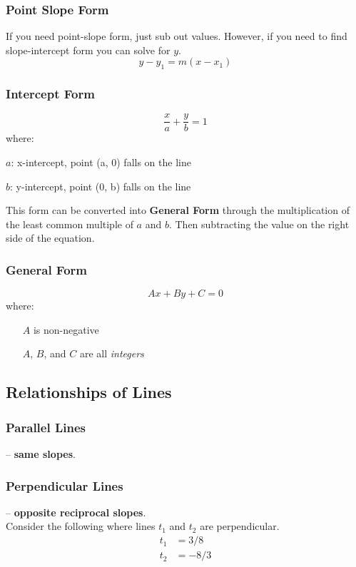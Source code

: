 \documentclass[twocolumn]{article}
\newenvironment{adescription}[1]
{\begin{list}{}%
	{\renewcommand\makelabel[1]{##1\hfill}%
		\settowidth\labelwidth{\makelabel{#1}}%
		\setlength\leftmargin{\labelwidth}
		\addtolength\leftmargin{\labelsep}}}
{\end{list}}
\newcommand{\bd}{\textbf}
\newcommand{\dquad}{\quad{}\quad{}}
\begin{document}
	    \subsubsection{Point Slope Form}
	    	If you need point-slope form, just sub out values. However, if you need to find slope-intercept form you can solve for $y$.
	    	\begin{equation*}
	    		y - y_1 = m(x - x_1)
	    	\end{equation*}
	    \subsubsection{Intercept Form}
	    	\begin{equation*}
	    		\frac{x}{a} + \frac{y}{b} = 1
	    	\end{equation*}
    		where:
    		\begin{adescription}{\dquad{}$b$:}
    			\item[\dquad{}$a$:] x-intercept, point (a, 0) falls on the line
    			\item[\dquad{}$b$:] y-intercept, point (0, b) falls on the line
    		\end{adescription}
    		This form can be converted into \bd{General Form} through the multiplication of the least common multiple of $a$ and $b$. Then subtracting   the value on the right side of the equation.
	    \subsubsection{General Form}
	    	\begin{equation*}
	    		Ax + By + C = 0
	    	\end{equation*}
    		where:
    		\begin{itemize}[label=--]
    			\item[] $A$ is non-negative
    			\item[] $A$, $B$, and $C$ are all \emph{integers}
    		\end{itemize}
	  \subsection{Relationships of Lines}
	    \subsubsection{Parallel Lines}
	    	-- \bd{same slopes}.
	    \subsubsection{Perpendicular Lines}
	    	-- \bd{opposite reciprocal slopes}. \\
	    	Consider the following where lines $t_1$ and $t_2$ are perpendicular.
	    	\begin{align*}
	    		t_1 &= 3/8 \\
	    		t_2 &= -8/3
	    	\end{align*}
    
\end{document}
